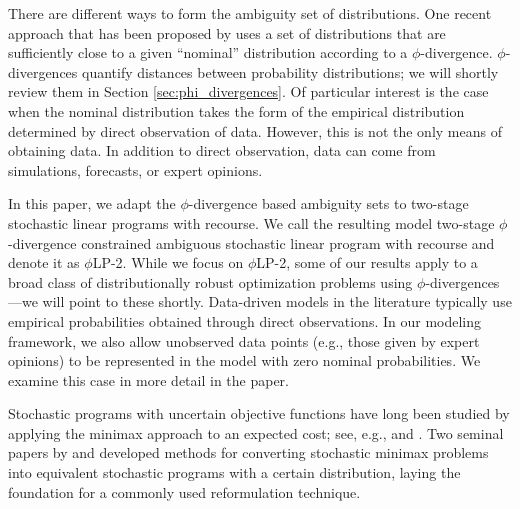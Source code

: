 \documentclass[opre,nonblindrev]{informs3} %
\newcommand{\plp}{$\phi$LP-2}
\begin{document}
There are different ways to form the ambiguity set of distributions.
One recent approach that has been proposed by \citet{bental2013robust} uses a set of distributions that are sufficiently close to a given ``nominal'' distribution according to a $\phi$-divergence. 
$\phi$-divergences quantify distances between probability distributions; we will shortly review them in Section \ref{sec:phi_divergences}. 
Of particular interest is the case when the nominal distribution takes the form of the empirical distribution determined by direct observation of data.
However, this is not the only means of obtaining data. 
In addition to direct observation, data can come from simulations, forecasts, or expert opinions.



In this paper, we adapt the $\phi$-divergence based ambiguity sets to two-stage stochastic linear programs with recourse. 
We call the resulting model two-stage $\phi$-divergence constrained ambiguous stochastic linear program with recourse and denote it as \plp. 
While we focus on \plp, some of our results apply to a broad class of distributionally robust optimization problems using $\phi$-divergences---we will point to these shortly. 
Data-driven models in the literature typically use empirical probabilities obtained through direct observations.
In our modeling framework, we also allow unobserved data points (e.g., those given by expert opinions) to be represented in the model with zero nominal probabilities. 
We examine this case in more detail in the paper.



Stochastic programs with uncertain objective functions have long been studied by applying the minimax approach to an expected cost; see, e.g., \cite{zackova1966minimax} and \cite{dupacova_87}.
Two seminal papers by \cite{shapiro2002minimax} and \cite{shapiro2004class} developed methods for converting stochastic minimax problems into equivalent stochastic programs with a certain distribution, laying the foundation for a commonly used reformulation technique.
\end{document}
